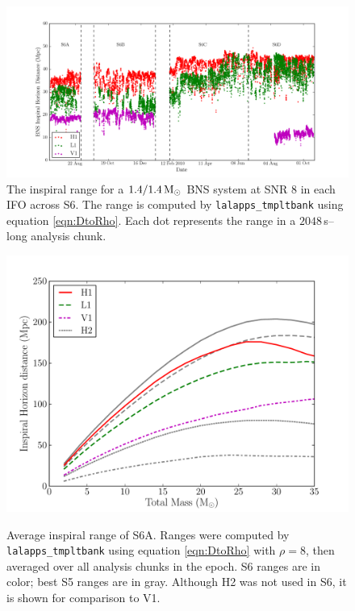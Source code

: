 \begin{landscape}
\begin{figure}[p]
\begin{center}
\includegraphics[width=9in]{figures/s6-hzrange_v_time.png}
\end{center}
\caption{The inspiral range for a $1.4/1.4\,\mathrm{M_\odot}$ \ac{BNS} system at \ac{SNR} $8$ in each \ac{IFO} across \ac{S6}. The range is computed by \texttt{lalapps\_tmpltbank} using equation \ref{eqn:DtoRho}. Each dot represents the range in a $2048\,$s--long analysis chunk.}
\label{fig:s6_insprange_v_time}
\end{figure}
\end{landscape}

\clearpage

\begin{figure}[p]
\begin{center}
\label{fig:s6a_insprange}
\includegraphics[width=6in]{figures/s6a_insprange.pdf}
\end{center}
\caption{Average inspiral range of S6A. Ranges were computed by \texttt{lalapps\_tmpltbank} using equation \ref{eqn:DtoRho} with $\rho=8$, then averaged over all analysis chunks in the epoch. S6 ranges are in color; best S5 ranges are in gray. Although H2 was not used in \ac{S6}, it is shown for comparison to V1.}
\end{figure}

